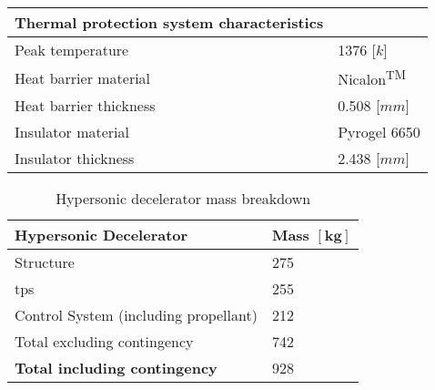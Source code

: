 \begin{table}[H]
\begin{tabular}{|p{}|p{}|}
		\textbf{Thermal protection system characteristics}	&		\\ \hline \hline
		Peak temperature							&	 1376 [$k$]		\\ \hline
		Heat barrier material							&	Nicalon\textsuperscript{TM}		\\ \hline
		Heat barrier thickness							&	0.508 [$mm$]		\\ \hline
		Insulator material								&	Pyrogel\textsuperscript{\textregistered} 6650		\\ \hline
		Insulator thickness								&	2.438 [$mm$]		\\ \hline
			
		
	\end{tabular}
\end{table}

\newpage

\begin{table}[H]
	\centering
	\caption{Hypersonic decelerator mass breakdown}
	\label{tab:DeceleratorMass}
	\begin{tabular}{|p{}|p{}|} \hline
		\textbf {Hypersonic Decelerator}             & \textbf{Mass $\mathbf{[kg]}$ } \\ \hline \hline
		Structure          &		 275       \\ \hline
		\acrlong{tps} &		  255      \\ \hline
		Control System (including propellant) 		   &  212      \\ \hline \hline
		Total excluding contingency              	   &  742     \\ \hline
		\textbf {Total including contingency}                 &  928      \\ \hline
	\end{tabular}
\end{table}

